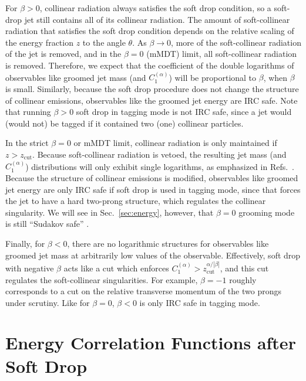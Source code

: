 \documentclass[letterpaper,11pt]{article}
\newcommand{\C}[2]{C^{(#2)}_{#1}}
\newcommand{\zcut}{z_\text{cut}}
\DeclareRobustCommand{\Sec}[1]{Sec.~\ref{#1}}
\DeclareRobustCommand{\Refs}[1]{Refs.~\cite{#1}}
\begin{document}
For $\beta > 0$, collinear radiation always satisfies the soft drop condition, so a soft-drop jet still contains all of its collinear radiation.  The amount of soft-collinear radiation that satisfies the soft drop condition depends on the relative scaling of the energy fraction $z$ to the angle $\theta$.  As $\beta\to 0$, more of the soft-collinear radiation of the jet is removed, and in the $\beta=0$ (mMDT) limit, all soft-collinear radiation is removed.  Therefore, we expect that the coefficient of the double logarithms of observables like groomed jet mass (and $\C{1}{\alpha}$) will be proportional to $\beta$, when $\beta$ is small.
%
Similarly, because the soft drop procedure does not change the structure of collinear emissions, observables like the groomed jet energy are IRC safe. Note that running $\beta > 0$ soft drop in tagging mode is not IRC safe, since a jet would (would not) be tagged if it contained two (one) collinear particles. 

In the strict $\beta = 0$ or mMDT limit, collinear radiation is only maintained if $z > \zcut$.  Because soft-collinear radiation is vetoed, the resulting jet mass (and $\C{1}{\alpha}$) distributions will only exhibit single logarithms, as emphasized in \Refs{taggersRES,taggersNLO}. Because the structure of collinear emissions is modified, observables like groomed jet energy are only IRC safe if soft drop is used in tagging mode, since that forces the jet to have a hard two-prong structure, which regulates the collinear singularity.  We will see in \Sec{sec:energy}, however, that $\beta = 0$ grooming mode is still ``Sudakov safe'' \cite{Larkoski:2013paa}.

Finally, for $\beta < 0$, there are no logarithmic structures for observables like groomed jet mass at arbitrarily low values of the observable.  Effectively, soft drop with negative $\beta$ acts like a cut which enforces
 $\C{1}{\alpha} > \zcut^{\alpha/|\beta|}$,
and this cut regulates the soft-collinear singularities.  For example, $\beta = -1$ roughly corresponds to a cut on the relative transverse momentum of the two prongs under scrutiny.  Like for $\beta = 0$, $\beta < 0$ is only IRC safe in tagging mode.

\section{Energy Correlation Functions after Soft Drop} \label{sec:ang}
\end{document}

